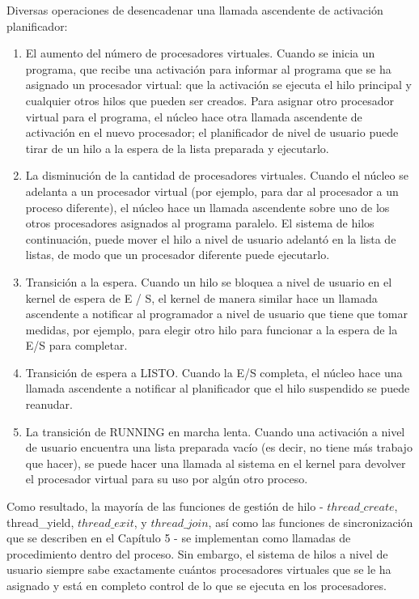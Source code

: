\documentclass[10pt]{book}
\begin{document}
Diversas operaciones de desencadenar una llamada ascendente de activación planificador:
\begin{enumerate}
\item El aumento del número de procesadores virtuales. Cuando se inicia un programa, que recibe una activación para informar al programa que se ha asignado un procesador virtual: que la activación se ejecuta el hilo principal y cualquier otros hilos que pueden ser creados. Para asignar otro procesador virtual para el programa, el núcleo hace otra llamada ascendente de activación en el nuevo procesador; el planificador de nivel de usuario puede tirar de un hilo a la espera de la lista preparada y ejecutarlo.

\item La disminución de la cantidad de procesadores virtuales. Cuando el núcleo se adelanta a un procesador virtual (por ejemplo, para dar al procesador a un proceso diferente), el núcleo hace un llamada ascendente sobre uno de los otros procesadores asignados al programa paralelo. El sistema de hilos continuación, puede mover el hilo a nivel de usuario adelantó en la lista de listas, de modo que un procesador diferente puede ejecutarlo.

\item Transición a la espera. Cuando un hilo se bloquea a nivel de usuario en el kernel de espera de E / S, el kernel de manera similar hace un llamada ascendente a notificar al programador a nivel de usuario que tiene que tomar medidas, por ejemplo, para elegir otro hilo para funcionar a la espera de la E/S para completar.

\item Transición de espera a LISTO. Cuando la E/S completa, el núcleo hace una llamada ascendente a notificar al planificador que el hilo suspendido se puede reanudar.

\item La transición de RUNNING en marcha lenta. Cuando una activación a nivel de usuario encuentra una lista preparada vacío (es decir, no tiene más trabajo que hacer), se puede hacer una llamada al sistema en el kernel para devolver el procesador virtual para su uso por algún otro proceso.
\end{enumerate}

Como resultado, la mayoría de las funciones de gestión de hilo - $thread\_create$, {\mf thread\_yield}, $thread\_exit$, y $thread\_join$, así como las funciones de sincronización que se describen en el Capítulo 5 - se implementan como llamadas de procedimiento dentro del proceso. Sin embargo, el sistema de hilos a nivel de usuario siempre sabe exactamente cuántos procesadores virtuales que se le ha asignado y está en completo control de lo que se ejecuta en los procesadores.
\end{document}
